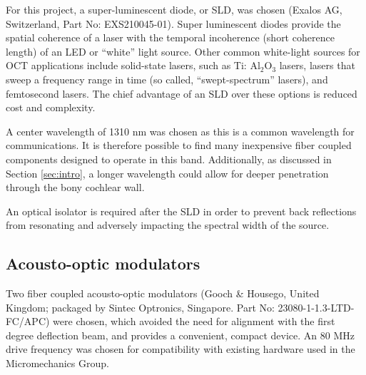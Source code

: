 For this project,  a super-luminescent diode, or SLD, was chosen (Exalos AG, Switzerland, Part No: EXS210045-01). Super luminescent diodes provide the spatial coherence of a laser with the temporal incoherence (short coherence length) of an LED or ``white'' light source. Other common white-light sources for OCT applications include solid-state lasers, such as Ti: Al$_2$O$_3$ lasers, lasers that sweep a frequency range in time (so called, ``swept-spectrum'' lasers), and femtosecond lasers. The chief advantage of an SLD over these options is reduced cost and complexity. \cite{bouma}

A center wavelength of 1310 nm was chosen as this is a common wavelength for communications. It is therefore possible to find many inexpensive fiber coupled components designed to operate in this band. Additionally, as discussed in Section \ref{sec:intro}, a longer wavelength could allow for deeper penetration through the bony cochlear wall. \cite{Sandell2011} \cite{Bashkatov2006}

An optical isolator is required after the SLD in order to prevent back reflections from resonating and adversely impacting the spectral width of the source.


\subsection{Acousto-optic modulators}

Two fiber coupled acousto-optic modulators (Gooch \& Housego, United Kingdom; packaged by Sintec Optronics, Singapore. Part No: 23080-1-1.3-LTD-FC/APC) were chosen, which avoided the need for alignment with the first degree deflection beam, and provides a convenient, compact device. An 80 MHz drive frequency was chosen for compatibility with existing hardware used in the Micromechanics Group. %

